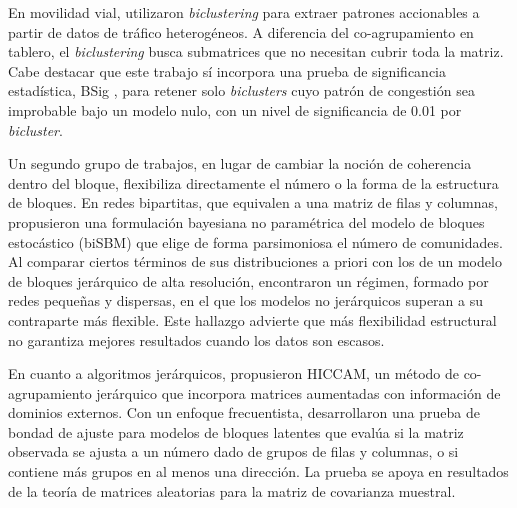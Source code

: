 En movilidad vial, \citet{Neves2022} utilizaron \emph{biclustering} para extraer
patrones accionables a partir de datos de tráfico heterogéneos. A diferencia
del co-agrupamiento en tablero, el \emph{biclustering} busca submatrices que no
necesitan cubrir toda la matriz. Cabe destacar que este trabajo sí
incorpora una prueba de significancia estadística, BSig \citep{Henriques2018},
para retener solo \emph{biclusters} cuyo patrón de congestión sea improbable bajo
un modelo nulo, con un nivel de significancia de 0.01 por \emph{bicluster}.

Un segundo grupo de trabajos, en lugar de cambiar la noción de coherencia
dentro del bloque, flexibiliza directamente el número o la forma de la
estructura de bloques. En redes bipartitas, que equivalen a una matriz de
filas y columnas, \citet{Yen2020} propusieron una formulación bayesiana no
paramétrica del modelo de bloques estocástico (biSBM) que elige de forma
parsimoniosa el número de comunidades. Al comparar ciertos términos de sus
distribuciones a priori con los de un modelo de bloques jerárquico de alta
resolución, encontraron un régimen, formado por redes pequeñas y dispersas, en
el que los modelos no jerárquicos superan a su contraparte más flexible. Este
hallazgo advierte que más flexibilidad estructural no garantiza mejores
resultados cuando los datos son escasos.

En cuanto a algoritmos jerárquicos, \citet{Sugahara2023} propusieron HICCAM,
un método de co-agrupamiento jerárquico que incorpora matrices aumentadas
con información de dominios externos. Con un enfoque frecuentista,
\citet{Watanabe2021gof} desarrollaron una prueba de bondad de ajuste para
modelos de bloques latentes que evalúa si la matriz observada se ajusta a un
número dado de grupos de filas y columnas, o si contiene más grupos en al
menos una dirección. La prueba se apoya en resultados de la teoría de
matrices aleatorias para la matriz de covarianza muestral.

